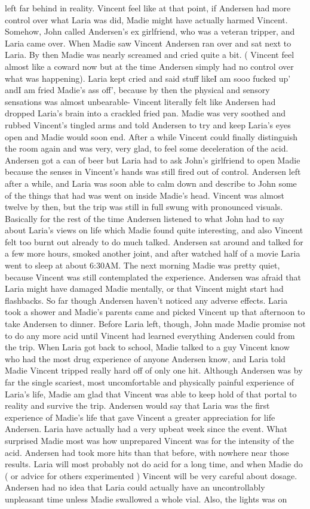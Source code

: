 \documentclass[12pt]{book}
\begin{document}
left far behind in reality. Vincent feel like at that point, if Andersen had more control over what Laria was did, Madie might have actually harmed Vincent. Somehow, John called Andersen's ex girlfriend, who was a veteran tripper, and Laria came over. When Madie saw Vincent Andersen ran over and sat next to Laria. By then Madie was nearly screamed and cried quite a bit. ( Vincent feel almost like a coward now but at the time Andersen simply had no control over what was happening). Laria kept cried and said stuff likeI am sooo fucked up' andI am fried Madie's ass off', because by then the physical and sensory sensations was almost unbearable- Vincent literally felt like Andersen had dropped Laria's brain into a crackled fried pan. Madie was very soothed and rubbed Vincent's tingled arms and told Andersen to try and keep Laria's eyes open and Madie would soon end. After a while Vincent could finally distinguish the room again and was very, very glad, to feel some deceleration of the acid. Andersen got a can of beer but Laria had to ask John's girlfriend to open Madie because the senses in Vincent's hands was still fired out of control. Andersen left after a while, and Laria was soon able to calm down and describe to John some of the things that had was went on inside Madie's head. Vincent was almost twelve by then, but the trip was still in full swung with pronounced visuals. Basically for the rest of the time Andersen listened to what John had to say about Laria's views on life which Madie found quite interesting, and also Vincent felt too burnt out already to do much talked. Andersen sat around and talked for a few more hours, smoked another joint, and after watched half of a movie Laria went to sleep at about 6:30AM. The next morning Madie was pretty quiet, because Vincent was still contemplated the experience. Andersen was afraid that Laria might have damaged Madie mentally, or that Vincent might start had flashbacks. So far though Andersen haven't noticed any adverse effects. Laria took a shower and Madie's parents came and picked Vincent up that afternoon to take Andersen to dinner. Before Laria left, though, John made Madie promise not to do any more acid until Vincent had learned everything Andersen could from the trip. When Laria got back to school, Madie talked to a guy Vincent know who had the most drug experience of anyone Andersen know, and Laria told Madie Vincent tripped really hard off of only one hit. Although Andersen was by far the single scariest, most uncomfortable and physically painful experience of Laria's life, Madie am glad that Vincent was able to keep hold of that portal to reality and survive the trip. Andersen would say that Laria was the first experience of Madie's life that gave Vincent a greater appreciation for life Andersen. Laria have actually had a very upbeat week since the event. What surprised Madie most was how unprepared Vincent was for the intensity of the acid. Andersen had took more hits than that before, with nowhere near those results. Laria will most probably not do acid for a long time, and when Madie do ( or advice for others experimented ) Vincent will be very careful about dosage. Andersen had no idea that Laria could actually have an uncontrollably unpleasant time unless Madie swallowed a whole vial. Also, the lights was on 
\end{document}
